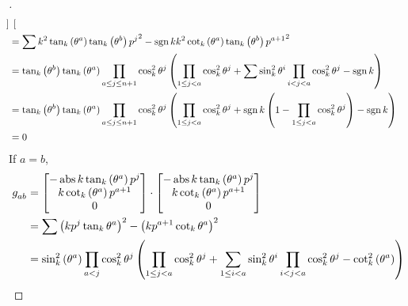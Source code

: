 \documentclass[stu, babel, american, biblatex, a4paper, draftall]{apa7}
\begin{document}
\begin{proof}[]
\begin{align*}
\begin{bmatrix}
        \end{bmatrix}                                                  \\
         & =
        \sum{k^2\tan_k\left(\tensor{\theta}{^a}\right)\tan_k\left(\tensor{\theta}{^b}\right){\tensor{p}{^j}}^2}
        -\sign{k}k^2\cot_k\left(\tensor{\theta}{^a}\right)\tan_k\left(\tensor{\theta}{^b}\right){\tensor{p}{^{a+1}}}^2 \\
         & =
        \tan_k\left(\tensor{\theta}{^b}\right)
        \tan_k\left(\tensor{\theta}{^a}\right)
        \prod_{a\le j\le n+1}{\cos_k^2\tensor{\theta}{^j}}
        \left(
        \prod_{1\le j<a}{\cos_k^2\tensor{\theta}{^j}}
        + \sum{
            \sin_k^2{\tensor{\theta}{^{i}}}\prod_{i<j<a}{\cos_k^2\tensor{\theta}{^j}}
        }
        -\sign{k}
        \right)                                                                                                        \\
         & =
        \tan_k\left(\tensor{\theta}{^b}\right)
        \tan_k\left(\tensor{\theta}{^a}\right)
        \prod_{a\le j\le n+1}{\cos_k^2\tensor{\theta}{^j}}
        \left(
        \prod_{1\le j<a}{\cos_k^2\tensor{\theta}{^j}}
        + \sign{k}\left(
        1-\prod_{1\le j<a}{\cos_k^2\tensor{\theta}{^j}}
        \right)
        - \sign{k}
        \right)                                                                                                        \\
         & = 0
    \end{align*}
    If $a=b$,
    \begin{align*}
        \tensor{g}{_a_b}
         & =\begin{bmatrix}
            -\abs{k}\tan_k\left(\tensor{\theta}{^a}\right)\tensor{p}{^j} \\
            k\cot_k\left(\tensor{\theta}{^a}\right)\tensor{p}{^{a+1}}    \\
            0                                                            \\
        \end{bmatrix}\cdot\begin{bmatrix}
            -\abs{k}\tan_k\left(\tensor{\theta}{^a}\right)\tensor{p}{^j} \\
            k\cot_k\left(\tensor{\theta}{^a}\right)\tensor{p}{^{a+1}}    \\
            0                                                            \\
        \end{bmatrix} \\
         & =
        \sum{\left(k\tensor{p}{^j}\tan_k\tensor{\theta}{^a}\right)^2}
        -\left(k\tensor{p}{^{a+1}}\cot_k\tensor{\theta}{^a}\right)^2  \\
         & =
        \sin_k^2\left(\tensor{\theta}{^a}\right)
        \prod_{a<j}{\cos_k^2\tensor{\theta}{^j}}
        \left(
        \prod_{1\le j<a}{\cos_k^2\tensor{\theta}{^j}}
        + \sum_{1\le i<a}{
            \sin_k^2{\tensor{\theta}{^{i}}}\prod_{i<j<a}{\cos_k^2\tensor{\theta}{^j}}
        }
        -\cot_k^2\left(\tensor{\theta}{^a}\right)
        \right)
    \end{align*}
\end{proof}
\end{document}
